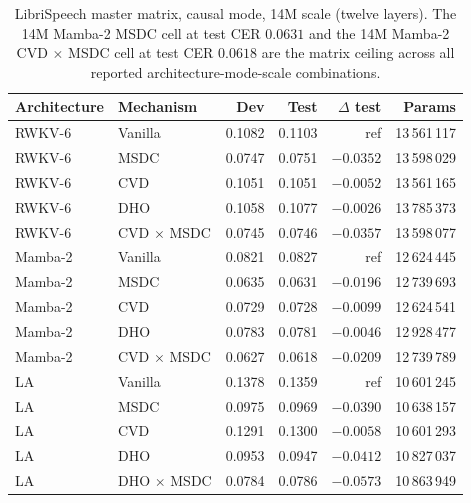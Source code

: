 \begin{table}[p]
\centering
\small
\caption[Master matrix on LibriSpeech, causal, 14M]{LibriSpeech
master matrix, causal mode, 14M scale (twelve layers). The 14M
Mamba-2 MSDC cell at test CER $0.0631$ and the 14M Mamba-2
CVD $\times$ MSDC cell at test CER $0.0618$ are the matrix ceiling
across all reported architecture-mode-scale combinations.}
\label{tab:results:master-matrix-causal-14m}
\setlength{\tabcolsep}{6pt}
\renewcommand{\arraystretch}{1.15}
\begin{tabularx}{\linewidth}{@{}p{2.0cm} X r r r r@{}}
\toprule
\textbf{Architecture} & \textbf{Mechanism} &
\textbf{Dev} & \textbf{Test} & \textbf{$\Delta$ test} & \textbf{Params} \\
\midrule
RWKV-6   & Vanilla         & 0.1082 & 0.1103 & ref       & 13\,561\,117 \\
RWKV-6   & MSDC            & 0.0747 & 0.0751 & $-0.0352$ & 13\,598\,029 \\
RWKV-6   & CVD             & 0.1051 & 0.1051 & $-0.0052$ & 13\,561\,165 \\
RWKV-6   & DHO             & 0.1058 & 0.1077 & $-0.0026$ & 13\,785\,373 \\
RWKV-6   & CVD $\times$ MSDC & 0.0745 & 0.0746 & $-0.0357$ & 13\,598\,077 \\
\addlinespace
Mamba-2  & Vanilla         & 0.0821 & 0.0827 & ref       & 12\,624\,445 \\
Mamba-2  & MSDC            & 0.0635 & 0.0631 & $-0.0196$ & 12\,739\,693 \\
Mamba-2  & CVD             & 0.0729 & 0.0728 & $-0.0099$ & 12\,624\,541 \\
Mamba-2  & DHO             & 0.0783 & 0.0781 & $-0.0046$ & 12\,928\,477 \\
Mamba-2  & CVD $\times$ MSDC & 0.0627 & 0.0618 & $-0.0209$ & 12\,739\,789 \\
\addlinespace
LA       & Vanilla         & 0.1378 & 0.1359 & ref       & 10\,601\,245 \\
LA       & MSDC            & 0.0975 & 0.0969 & $-0.0390$ & 10\,638\,157 \\
LA       & CVD             & 0.1291 & 0.1300 & $-0.0058$ & 10\,601\,293 \\
LA       & DHO             & 0.0953 & 0.0947 & $-0.0412$ & 10\,827\,037 \\
LA       & DHO $\times$ MSDC & 0.0784 & 0.0786 & $-0.0573$ & 10\,863\,949 \\
\bottomrule
\end{tabularx}
\end{table}

